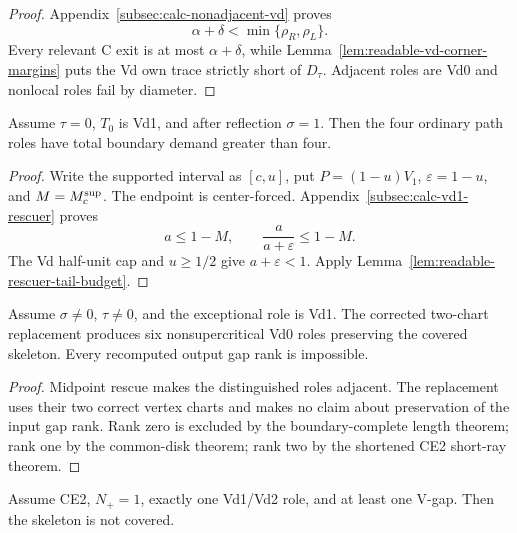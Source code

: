 \begin{proof}
Appendix~\ref{subsec:calc-nonadjacent-vd} proves
\[
 \alpha+\delta<\min\{\rho_R,\rho_L\}.
\]
Every relevant C exit is at most $\alpha+\delta$, while
Lemma~\ref{lem:readable-vd-corner-margins} puts the Vd own trace strictly
short of $D_\tau$.  Adjacent roles are Vd0 and nonlocal roles fail by
diameter.
\end{proof}

\begin{proposition}
\label{prop:readable-vd1-midpoint-rescuer}
Assume $\tau=0$, $T_0$ is Vd1, and after reflection $\sigma=1$.  Then the
four ordinary path roles have total boundary demand greater than four.
\end{proposition}

\begin{proof}
Write the supported interval as $[c,u]$, put
$P=(1-u)V_1$, $\varepsilon=1-u$, and $M=M_c^{\rm sup}$.  The endpoint is
center-forced.  Appendix~\ref{subsec:calc-vd1-rescuer} proves
\[
 a\le1-M,\qquad
 \frac{a}{a+\varepsilon}\le1-M.
\]
The Vd half-unit cap and $u\ge1/2$ give $a+\varepsilon<1$.  Apply
Lemma~\ref{lem:readable-rescuer-tail-budget}.
\end{proof}

\begin{proposition}
\label{prop:readable-one-vd-replacement}
Assume $\sigma\ne0$, $\tau\ne0$, and the exceptional role is Vd1.  The
corrected two-chart replacement produces six nonsupercritical Vd0 roles
preserving the covered skeleton.  Every recomputed output gap rank is
impossible.
\end{proposition}

\begin{proof}
Midpoint rescue makes the distinguished roles adjacent.  The replacement
uses their two correct vertex charts and makes no claim about preservation of
the input gap rank.  Rank zero is excluded by the boundary-complete length
theorem; rank one by the common-disk theorem; rank two by the shortened CE2
short-ray theorem.
\end{proof}



\begin{corollary}
\label{prop:new-one-vd-assembly}
Assume CE2, $N_+=1$, exactly one Vd1/Vd2 role, and at least one V-gap.  Then
the skeleton is not covered.
\end{corollary}


